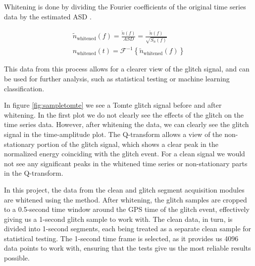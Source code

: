 \documentclass[12pt]{article}
\begin{document}
\medskip
\noindent Whitening is done by dividing the Fourier coefficients of the original time series data by the estimated ASD \cite{collaboration_guide_2020}.

\begin{align}
    \tilde{n}_\text{whitened}(f) = \frac{\tilde{n}(f)}{ASD} = \frac{\tilde{n}(f)}{\sqrt{S_n(f)}} \\
    n_\text{whitened}(t) = \mathcal{F}^{-1} \left\{ \tilde{n}_\text{whitened}(f) \right\}
    \label{eq:whitening}
\end{align}

\medskip
\noindent This data from this process allows for a clearer view of the glitch signal, and can be used for further analysis, such as statistical testing or machine learning classification.

\medskip
\noindent In figure \ref{fig:sampletomte} we see a Tomte glitch signal before and after whitening. In the first plot we do not clearly see the effects of the glitch on the time series data. However, after whitening the data, we can clearly see the glitch signal in the time-amplitude plot. The Q-transform allows a view of the non-stationary portion of the glitch signal, which shows a clear peak in the normalized energy coinciding with the glitch event. For a clean signal we would not see any significant peaks in the whitened time series or non-stationary parts in the Q-transform.

\medskip
\noindent In this project, the data from the clean and glitch segment acquisition modules are whitened using the method. After whitening, the glitch samples are cropped to a 0.5-second time window around the GPS time of the glitch event, effectively giving us a 1-second glitch sample to work with. The clean data, in turn, is divided into 1-second segments, each being treated as a separate clean sample for statistical testing. The 1-second time frame is selected, as it provides us 4096 data points to work with, ensuring that the tests give us the most reliable results possible.
\end{document}
